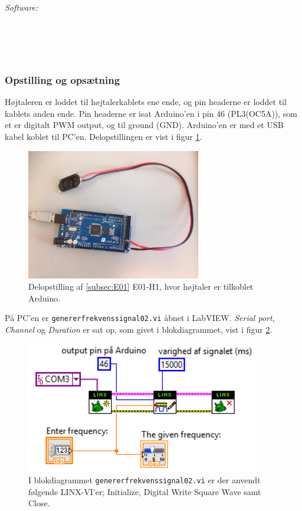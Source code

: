 		\textit{Software:}\\
		\labview\\
		\visa\\
		\vi\\
		\ardsw\
	
		\subsubsection{Opstilling og opsætning}
		Højtaleren er loddet til højtalerkablets ene ende, og pin headerne er loddet til kablets anden ende. 
		Pin headerne er isat Arduino'en i pin 46 (PL3(OC5A)), som et er digitalt PWM output, og til ground (GND). 
		Arduino'en er med et USB kabel koblet til PC'en. Delopstillingen er vist i figur \ref{fig:E01}.\\ 
	  
			\begin{figure}[htb]
			\centering
				\includegraphics[width=3in]{haArduino}
				\caption{Delopstilling af \ref{subsec:E01} E01-H1, hvor højtaler er tilkoblet Arduino.}	
				\label{fig:E01}
			\end{figure}
	
		På PC'en er \texttt{genererfrekvenssignal02.vi} åbnet i LabVIEW. \textit{Serial port}, \textit{Channel} og \textit{Duration} er sat op, som givet i blokdiagrammet, vist i figur \ref{fig:bdgenerer}.   \\   
	
			\begin{figure}[htb]
			\centering
				\includegraphics[width=4in]{genererfrekvenssignal02}
				\caption{I blokdiagrammet \texttt{genererfrekvenssignal02.vi} er der anvendt følgende LINX-VI'er; Initialize, Digital Write Square Wave samt Close.}	
				\label{fig:bdgenerer}
			\end{figure}	  
	
